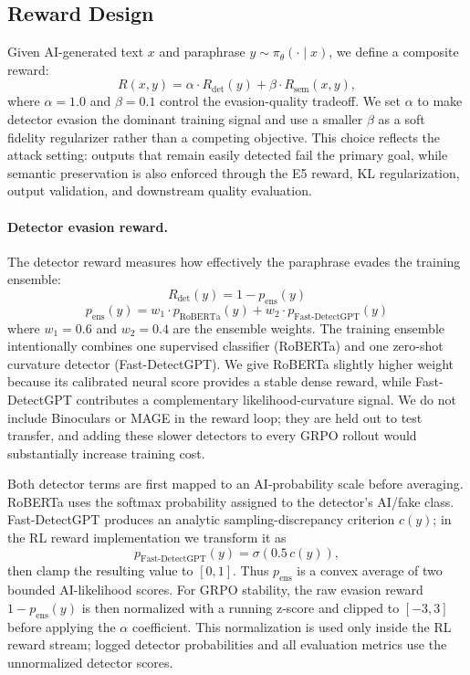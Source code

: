 \documentclass[11pt]{article}
\begin{document}
\subsection{Reward Design}
\label{sec:reward}

Given AI-generated text $x$ and paraphrase $y \sim \pi_\theta(\cdot \mid x)$, we define a composite reward:
\begin{equation}
  R(x, y) = \alpha \cdot R_{\text{det}}(y) + \beta \cdot R_{\text{sem}}(x, y),
  \label{eq:reward}
\end{equation}
where $\alpha = 1.0$ and $\beta = 0.1$ control the evasion-quality tradeoff.
We set $\alpha$ to make detector evasion the dominant training signal and use a smaller $\beta$ as a soft fidelity regularizer rather than a competing objective. This choice reflects the attack setting: outputs that remain easily detected fail the primary goal, while semantic preservation is also enforced through the E5 reward, KL regularization, output validation, and downstream quality evaluation.

\paragraph{Detector evasion reward.} The detector reward measures how effectively the paraphrase evades the training ensemble:
\begin{equation}
  R_{\text{det}}(y) = 1 - p_{\text{ens}}(y)
\end{equation}
\begin{equation}
  p_{\text{ens}}(y) = w_1 \cdot p_{\text{RoBERTa}}(y) + w_2 \cdot p_{\text{Fast-DetectGPT}}(y)
\end{equation}
where $w_1 = 0.6$ and $w_2 = 0.4$ are the ensemble weights. The training ensemble intentionally combines one supervised classifier (RoBERTa) and one zero-shot curvature detector (Fast-DetectGPT). We give RoBERTa slightly higher weight because its calibrated neural score provides a stable dense reward, while Fast-DetectGPT contributes a complementary likelihood-curvature signal. We do not include Binoculars or MAGE in the reward loop; they are held out to test transfer, and adding these slower detectors to every GRPO rollout would substantially increase training cost.

Both detector terms are first mapped to an AI-probability scale before averaging. RoBERTa uses the softmax probability assigned to the detector's AI/fake class. Fast-DetectGPT produces an analytic sampling-discrepancy criterion $c(y)$; in the RL reward implementation we transform it as
\begin{equation}
  p_{\text{Fast-DetectGPT}}(y) = \sigma(0.5\,c(y)),
\end{equation}
then clamp the resulting value to $[0,1]$. Thus $p_{\text{ens}}$ is a convex average of two bounded AI-likelihood scores. For GRPO stability, the raw evasion reward $1-p_{\text{ens}}(y)$ is then normalized with a running z-score and clipped to $[-3,3]$ before applying the $\alpha$ coefficient. This normalization is used only inside the RL reward stream; logged detector probabilities and all evaluation metrics use the unnormalized detector scores.
\end{document}
